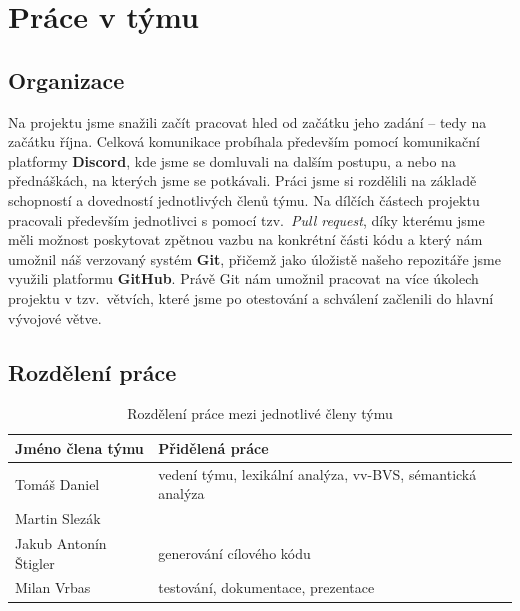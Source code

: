 \documentclass[a4paper, 12pt]{article} %
\begin{document}
    \newpage
    \section{Práce v týmu}
        \subsection{Organizace}
            Na projektu jsme snažili začít pracovat hled od začátku jeho zadání -- tedy
            na začátku října. Celková komunikace probíhala především pomocí komunikační
            platformy \textbf{Discord}, kde jsme se domluvali na dalším postupu, a nebo 
            na přednáškách, na kterých jsme se potkávali. Práci jsme si rozdělili na 
            základě schopností a dovedností jednotlivých členů týmu. Na dílčích částech
            projektu pracovali především jednotlivci s pomocí tzv.\ \textit{Pull request}, 
            díky kterému jsme měli možnost poskytovat zpětnou vazbu na konkrétní části kódu 
            a který nám umožnil náš verzovaný systém \textbf{Git}, přičemž jako úložistě 
            našeho repozitáře jsme využili platformu \textbf{GitHub}. Právě Git nám umožnil
            pracovat na více úkolech projektu v tzv.\ větvích, které jsme po otestování a 
            schválení začlenili do hlavní vývojové větve.

        \subsection{Rozdělení práce}            
            \begin{table}[h]
                \centering
                \begin{tabular}{| l | l |}
                    \hline
                    \textbf{Jméno člena týmu} & \textbf{Přidělená práce} \\
                    \hline
                    Tomáš Daniel            &  vedení týmu, lexikální analýza, vv-BVS, sémantická analýza\\
                    Martin Slezák           &  \\
                    Jakub Antonín Štigler   &  generování cílového kódu \\
                    Milan Vrbas             & testování, dokumentace, prezentace \\
                    \hline
                \end{tabular}
                \caption{Rozdělení práce mezi jednotlivé členy týmu}
            \end{table}
\end{document}
